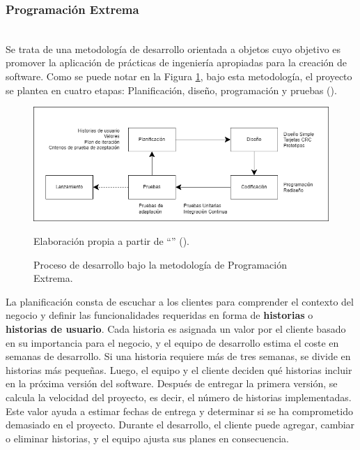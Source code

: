 \subsubsection{Programación Extrema}\hfill\\ 
\indent
Se trata de una metodología de desarrollo orientada a objetos cuyo objetivo es promover la aplicación de prácticas de ingeniería apropiadas para la creación de software. Como se puede notar en la Figura \ref{figs:modelo_desarrollo_xp}, bajo esta metodología, el proyecto se plantea en cuatro etapas: Planificación, diseño, programación y pruebas (\cite{pressman2005software}). 
\begin{figure}[H]
	\centering
	\includegraphics[width=1.0\textwidth]{images/marcoteorico/modelo_xp.png}
	\caption{Proceso de desarrollo bajo la metodología de Programación Extrema.}
    \vspace{-0.2cm}
	\footnotesize{{Elaboración propia a partir de ``\textit{}'' (\citeyear{pressman2005software}).}}
	\label{figs:modelo_desarrollo_xp} 
\end{figure}
La planificación consta de escuchar a los clientes para comprender el contexto del negocio y definir las funcionalidades requeridas en forma de \textbf{historias} o \textbf{historias de usuario}. Cada historia es asignada un valor por el cliente basado en su importancia para el negocio, y el equipo de desarrollo estima el coste en semanas de desarrollo. Si una historia requiere más de tres semanas, se divide en historias más pequeñas. Luego, el equipo y el cliente deciden qué historias incluir en la próxima versión del software. Después de entregar la primera versión, se calcula la velocidad del proyecto, es decir, el número de historias implementadas. Este valor ayuda a estimar fechas de entrega y determinar si se ha comprometido demasiado en el proyecto. Durante el desarrollo, el cliente puede agregar, cambiar o eliminar historias, y el equipo ajusta sus planes en consecuencia.\\ \indent
